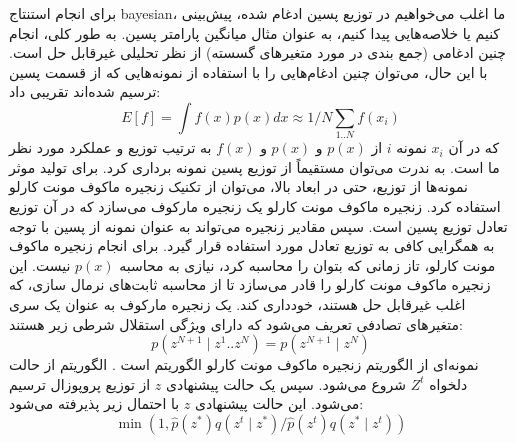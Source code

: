 برای انجام استنتاج \gls{bayesian}، ما اغلب می‌خواهیم در توزیع پسین ادغام شده، پیش‌بینی کنیم یا خلاصه‌هایی پیدا کنیم، به عنوان مثال میانگین پارامتر پسین. به طور کلی، انجام چنین ادغامی (جمع بندی در مورد متغیرهای گسسته) از نظر تحلیلی غیرقابل حل است. با این حال، می‌توان چنین ادغام‌هایی را با استفاده از نمونه‌هایی که از قسمت پسین ترسیم شده‌اند تقریبی داد:
\begin{equation}
	E[f]=\int f(x) p(x) d x \approx 1 / N \sum_{1 . . N} f\left(x_{i}\right)
\end{equation}
که در آن $x_i$  نمونه $i$ از $p(x)$ و $p(x)$  و $f(x)$ به ترتیب توزیع و عملکرد مورد نظر ما است. به ندرت می‌توان مستقیماً از توزیع پسین نمونه برداری کرد. برای تولید موثر نمونه‌ها از توزیع، حتی در ابعاد بالا، می‌توان از تکنیک زنجیره ماکوف مونت کارلو استفاده کرد. زنجیره ماکوف مونت کارلو یک زنجیره مارکوف می‌سازد که در آن توزیع تعادل توزیع پسین است. سپس مقادیر زنجیره می‌تواند به عنوان نمونه از پسین با توجه به همگرایی کافی به توزیع تعادل مورد استفاده قرار گیرد. برای انجام زنجیره ماکوف مونت کارلو، تاز زمانی که بتوان  را محاسبه کرد، نیازی به محاسبه $p(x)$  نیست. این زنجیره ماکوف مونت کارلو را قادر می‌سازد تا از محاسبه ثابت‌های نرمال سازی، که اغلب غیرقابل حل هستند، خودداری کند.
یک زنجیره مارکوف به عنوان یک سری متغیرهای تصادفی تعریف می‌شود که دارای ویژگی استقلال شرطی زیر هستند:
\begin{equation}
	p\left(z^{N+1} \mid z^{1} . . z^{N}\right)=p\left(z^{N+1} \mid z^{N}\right)
\end{equation}
نمونه‌ای از الگوریتم زنجیره ماکوف مونت کارلو الگوریتم  است \cite{hastings1970monte}. الگوریتم   از حالت دلخواه   $Z^t$ شروع می‌شود. سپس یک حالت پیشنهادی $z$  از توزیع پروپوزال  ترسیم می‌شود. این حالت پیشنهادی $z$   با احتمال زیر پذیرفته می‌شود:
\begin{equation}
	\min \left(1, \hat{p}\left(z^{*}\right) q\left(z^{t} \mid z^{*}\right) / \hat{p}\left(z^{t}\right) q\left(z^{*} \mid z^{t}\right)\right)
\end{equation}
